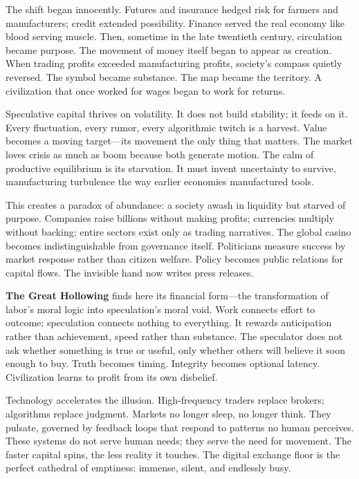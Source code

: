 \documentclass[11pt,twoside]{book}
\begin{document}
The shift began innocently.  Futures and insurance hedged risk for farmers and manufacturers; credit extended possibility.  Finance served the real economy like blood serving muscle.  Then, sometime in the late twentieth century, circulation became purpose.  The movement of money itself began to appear as creation.  When trading profits exceeded manufacturing profits, society’s compass quietly reversed.  The symbol became substance.  The map became the territory.  A civilization that once worked for wages began to work for returns.

Speculative capital thrives on volatility.  It does not build stability; it feeds on it.  Every fluctuation, every rumor, every algorithmic twitch is a harvest.  Value becomes a moving target—its movement the only thing that matters.  The market loves crisis as much as boom because both generate motion.  The calm of productive equilibrium is its starvation.  It must invent uncertainty to survive, manufacturing turbulence the way earlier economies manufactured tools.

This creates a paradox of abundance: a society awash in liquidity but starved of purpose.  Companies raise billions without making profits; currencies multiply without backing; entire sectors exist only as trading narratives.  The global casino becomes indistinguishable from governance itself.  Politicians measure success by market response rather than citizen welfare.  Policy becomes public relations for capital flows.  The invisible hand now writes press releases.

\textbf{The Great Hollowing} finds here its financial form—the transformation of labor’s moral logic into speculation’s moral void.  Work connects effort to outcome; speculation connects nothing to everything.  It rewards anticipation rather than achievement, speed rather than substance.  The speculator does not ask whether something is true or useful, only whether others will believe it soon enough to buy.  Truth becomes timing.  Integrity becomes optional latency.  Civilization learns to profit from its own disbelief.

Technology accelerates the illusion.  High-frequency traders replace brokers; algorithms replace judgment.  Markets no longer sleep, no longer think.  They pulsate, governed by feedback loops that respond to patterns no human perceives.  These systems do not serve human needs; they serve the need for movement.  The faster capital spins, the less reality it touches.  The digital exchange floor is the perfect cathedral of emptiness: immense, silent, and endlessly busy.
\end{document}
